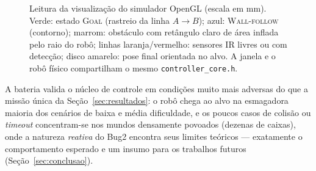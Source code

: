 \documentclass[11pt,a4paper]{article}
\begin{document}
\begin{figure}[H]
\centering
{}
\caption{Leitura da visualização do simulador OpenGL (escala em mm). Verde: estado \textsc{Goal} (rastreio da linha $A\!\to\!B$); azul: \textsc{Wall-follow} (contorno); marrom: obstáculo com retângulo claro de área inflada pelo raio do robô; linhas laranja/vermelho: sensores IR livres ou com detecção; disco amarelo: pose final orientada no alvo. A janela e o robô físico compartilham o mesmo \texttt{controller\_core.h}.}
\label{fig:gl}
\end{figure}

\noindent A bateria valida o núcleo de controle em condições muito mais adversas do que a missão única da Seção~\ref{sec:resultados}: o robô chega ao alvo na esmagadora maioria dos cenários de baixa e média dificuldade, e os poucos casos de colisão ou \emph{timeout} concentram-se nos mundos densamente povoados (dezenas de caixas), onde a natureza \emph{reativa} do Bug2 encontra seus limites teóricos --- exatamente o comportamento esperado e um insumo para os trabalhos futuros (Seção~\ref{sec:conclusao}).
\end{document}
